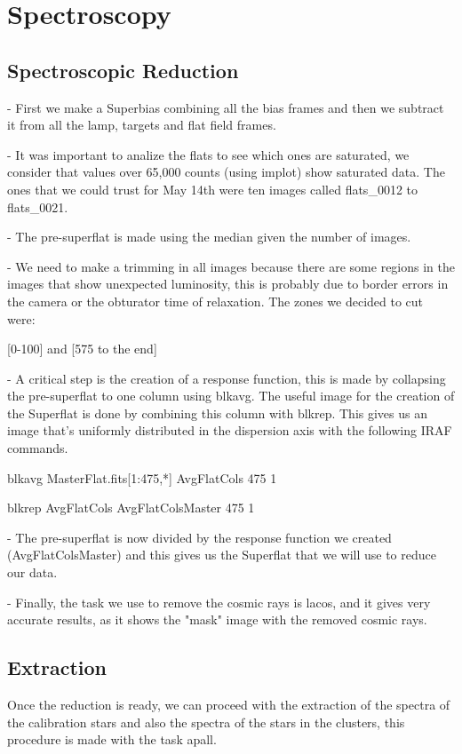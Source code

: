 \section{Spectroscopy}


\subsection{Spectroscopic Reduction}

- First we make a Superbias combining all the bias frames and then we subtract it from all the lamp, targets and flat field frames.

- It was important to analize the flats to see which ones are saturated, we consider that values over 65,000 counts (using implot) show saturated data. The ones that we could trust for May 14th were ten images called flats\_0012 to flats\_0021.

- The pre-superflat is made using the median given the number of images.

- We need to make a trimming in all images because there are some regions in the images that show unexpected luminosity, this is probably due to border errors in the camera or the obturator time of relaxation. The zones we decided to cut were:

[0-100] and [575 to the end]

- A critical step is the creation of a response function, this is made by collapsing the pre-superflat to one column using blkavg. The useful image for the creation of the Superflat is done by combining this column with blkrep. This gives us an image that's uniformly distributed in the dispersion axis with the following IRAF commands.

blkavg MasterFlat.fits[1:475,*] AvgFlatCols 475 1

blkrep AvgFlatCols AvgFlatColsMaster 475 1

- The pre-superflat is now divided by the response function we created (AvgFlatColsMaster) and this gives us the Superflat that we will use to reduce our data.

- Finally, the task we use to remove the cosmic rays is lacos, and it gives very accurate results, as it shows the "mask" image with the removed cosmic rays.

\subsection{Extraction}

Once the reduction is ready, we can proceed with the extraction of the spectra of the calibration stars and also the spectra of the stars in the clusters, this procedure is made with the task apall.

